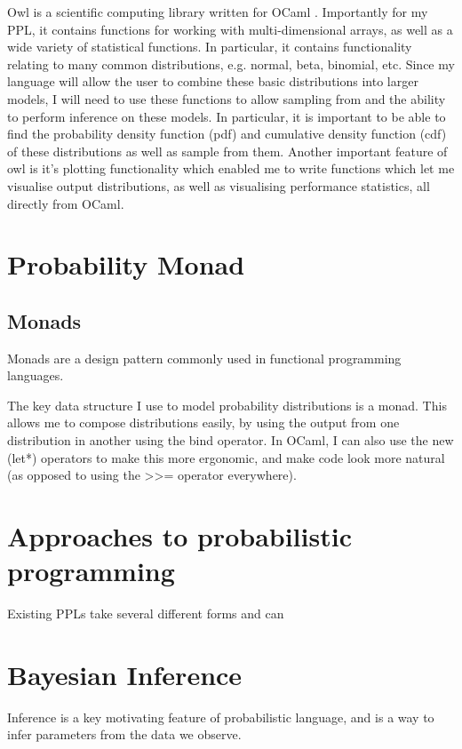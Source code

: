 Owl is a scientific computing library written for OCaml \cite{}. Importantly for my PPL, it contains functions for working with multi-dimensional arrays, as well as a wide variety of statistical functions. In particular, it contains functionality relating to many common distributions, e.g. normal, beta, binomial, etc. Since my language will allow the user to combine these basic distributions into larger models, I will need to use these functions to allow sampling from and the ability to perform inference on these models. In particular, it is important to be able to find the probability density function (pdf) and cumulative density function (cdf) of these distributions as well as sample from them. Another important feature of owl is it's plotting functionality which enabled me to write functions which let me visualise output distributions, as well as visualising performance statistics, all directly from OCaml.

\section{Probability Monad}

\subsection{Monads}

Monads are a design pattern commonly used in functional programming languages.

The key data structure I use to model probability distributions is a monad. This allows me to compose distributions easily, by using the output from one distribution in another using the bind operator. In OCaml, I can also use the new (let*) operators to make this more ergonomic, and make code look more natural (as opposed to using the >>= operator everywhere).

\section{Approaches to probabilistic programming}
Existing PPLs take several different forms and can 


\section{Bayesian Inference}
Inference is a key motivating feature of probabilistic language, and is a way to infer parameters from the data we observe.

